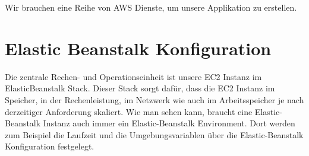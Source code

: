 \documentclass[a4paper, 12pt]{scrreprt}
\renewcommand\_{\textunderscore\allowbreak}
\begin{document}
Wir brauchen eine Reihe von AWS Dienste, um unsere Applikation zu erstellen. 

\section{Elastic Beanstalk Konfiguration}
Die zentrale Rechen- und 
Operationseinheit ist unsere EC2 Instanz im ElasticBeanstalk Stack. Dieser Stack sorgt dafür, dass die EC2 Instanz im Speicher, in der Rechenleistung, im Netzwerk wie auch im Arbeitsspeicher je nach derzeitiger Anforderung skaliert. Wie man sehen kann, braucht eine Elastic-Beanstalk Instanz auch immer ein Elastic-Beanstalk Environment. Dort werden zum Beispiel die Laufzeit und die Umgebungsvariablen über die Elastic-Beanstalk Konfiguration festgelegt.
\end{document}
